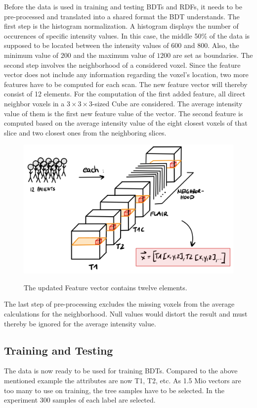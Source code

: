 \documentclass[
12pt,
headsepline,
bibliography=totoc,
twoside=semi,
fleqn
]{scrartcl}
\begin{document}
 Before the data is used in training and testing BDTs and RDFs, it needs to be pre-processed and translated into a shared format the BDT understands. The first step is the histogram normalization. A histogram displays the number of occurences of specific intensity values. In this case, the middle 50$\%$ of the data is supposed to be located between the intensity values of $600$ and $800$. Also, the minimum value of $200$ and the maximum value of $1200$ are set as boundaries. The second step involves the neighborhood of a considered voxel. Since the feature vector does not include any information regarding the voxel's location, two more features have to be computed for each scan. The new feature vector will thereby consist of 12 elements. For the computation of the first added feature, all direct neighbor voxels in a $3 \times 3 \times 3$-sized Cube are considered. The average intensity value of them is the first new feature value of the vector. The second feature is computed based on the average intensity value of the eight closest voxels of that slice and two closest ones from the neighboring slices. 

 \begin{figure}[H]
 \centering \includegraphics[scale=0.6]{BDT15.png}\label{fig:fig15}
 \caption{The updated Feature vector contains twelve elements.}
 \end{figure}



 The last step of pre-processing excludes the missing voxels from the average calculations for the neighborhood. Null values would distort the result and must thereby be ignored for the average intensity value. 

 \subsection{Training and Testing\label{sec:sec3-3}}
 The data is now ready to be used for training BDTs. Compared to the above mentioned example the attributes are now T1, T2, etc. As 1.5 Mio vectors are too many to use on training, the tree samples have to be selected. In the experiment 300 samples of each label are selected.
 
\end{document}
